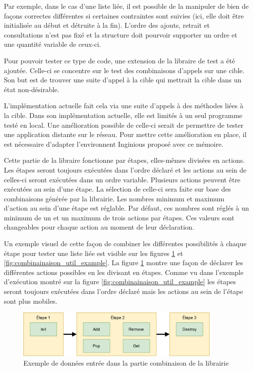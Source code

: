 \documentclass[a4paper]{report}
\begin{document}
Par exemple, dans le cas d'une liste liée, il est possible de la manipuler de bien de façons correctes différentes si certaines contraintes sont suivies (ici, elle doit être initialisée au début et détruite à la fin).
L'ordre des ajouts, retrait et consultations n'est pas fixé et la structure doit pourvoir supporter un ordre et une quantité variable de ceux-ci.

Pour pouvoir tester ce type de code, une extension de la libraire de test a été ajoutée.
Celle-ci se concentre sur le test des combinaisons d'appels sur une cible.
Son but est de trouver une suite d'appel à la cible qui mettrait la cible dans un état non-désirable.

L'implémentation actuelle fait cela via une suite d'appels à des méthodes liées à la cible.
Dans son implémentation actuelle, elle est limités à un seul programme testé en local.
Une amélioration possible de celle-ci serait de permettre de tester une application distante sur le réseau.
Pour mettre cette amélioration en place, il est nécessaire d'adapter l'environnent Inginious proposé avec ce mémoire.

Cette partie de la libraire fonctionne par étapes, elles-mêmes divisées en actions.
Les étapes seront toujours exécutées dans l'ordre déclaré et les actions au sein de celles-ci seront exécutées dans un ordre variable.
Plusieurs actions peuvent être exécutées au sein d'une étape.
La sélection de celle-ci sera faite sur base des combinaisons générée par la librairie.
Les nombres minimum et maximum d'action au sein d'une étape est réglable.
Par défaut, ces nombres sont réglés à un minimum de un et un maximum de trois actions par étapes.
Ces valeurs sont changeables pour chaque action au moment de leur déclaration.

Un exemple visuel de cette façon de combiner les différentes possibilités à chaque étape pour tester une liste liée est visible sur les figures \ref{fig:combinainaison_decl_example} et \ref{fig:combinainaison_util_example}.
La figure \ref{fig:combinainaison_decl_example} montre une façon de déclarer les différentes actions possibles en les divisant en étapes.
Comme vu dans l'exemple d'exécution montré sur la figure \ref{fig:combinainaison_util_example} les étapes seront toujours exécutées dans l'ordre déclaré mais les actions au sein de l'étape sont plus mobiles.

\begin{figure}[ht]
	\begin{center}
		\includegraphics[width=0.9\textwidth]{img/combinator_steps_decl.png} 
	\end{center}
	\caption{Exemple de données entrée dans la partie combinaison de la librairie}
	\label{fig:combinainaison_decl_example}
\end{figure}
\end{document}
